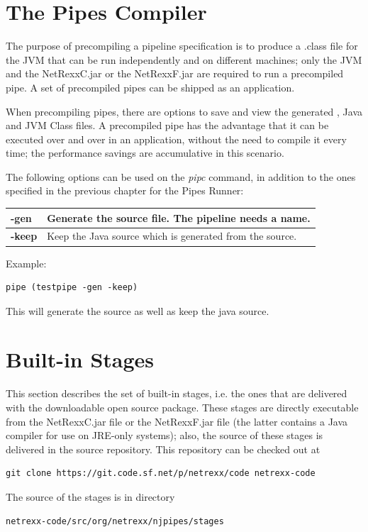 \chapter{The Pipes Compiler}
The purpose of precompiling a pipeline specification is to produce a
.class file for the JVM that can be run independently and on different
machines; only the JVM and the NetRexxC.jar or the NetRexxF.jar are
required to run a precompiled pipe. A set of precompiled pipes can be
shipped as an application.

When precompiling pipes, there are options to save and view the
generated \nr{}, Java and JVM Class files. A precompiled pipe has
the advantage that it can be executed over and over in an application,
without the need to compile it every time; the performance savings are
accumulative in this scenario.

The following options can be used on the \emph{pipc} command, in
addition to the ones specified in the previous chapter for the Pipes Runner:

\begin{tabularx}{\textwidth}{>{\bfseries}lX}
\toprule
-gen&Generate the \nr{} source file. The pipeline needs a name.
\\\midrule
-keep&Keep the Java source which is generated from the \nr{} source.
\\\bottomrule
\end{tabularx}

Example:
\begin{lstlisting}
pipe (testpipe -gen -keep)
\end{lstlisting}
This will generate the \nr{} source as well as keep the java source.



\chapter{Built-in Stages}
This section describes the set of built-in stages, i.e. the ones that
are delivered with the downloadable open source package. These stages
are directly executable from the NetRexxC.jar file or the NetRexxF.jar
file (the latter contains a Java compiler for use on JRE-only
systems); also, the source of these stages is delivered in the \nr{}
source repository. This repository can be checked out at
\begin{verbatim}
git clone https://git.code.sf.net/p/netrexx/code netrexx-code
\end{verbatim}
The source of the stages is in directory
\begin{verbatim}
netrexx-code/src/org/netrexx/njpipes/stages
\end{verbatim}

